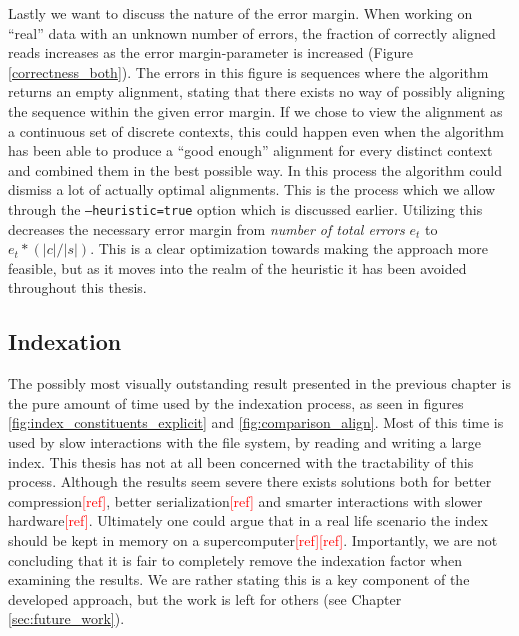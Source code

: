 \documentclass[thesis.tex]{subfiles}
\begin{document}
Lastly we want to discuss the nature of the error margin. When working on ``real'' data with an unknown number of errors, the fraction of correctly aligned reads increases as the error margin-parameter is increased (Figure \ref{correctness_both}). The errors in this figure is sequences where the algorithm returns an empty alignment, stating that there exists no way of possibly aligning the sequence within the given error margin. If we chose to view the alignment as a continuous set of discrete contexts, this could happen even when the algorithm has been able to produce a ``good enough'' alignment for every distinct context and combined them in the best possible way. In this process the algorithm could dismiss a lot of actually optimal alignments. This is the process which we allow through the \texttt{--heuristic=true} option which is discussed earlier. Utilizing this decreases the necessary error margin from \textit{number of total errors} $e_t$ to $e_t*(|c|/|s|)$. This is a clear optimization towards making the approach more feasible, but as it moves into the realm of the heuristic it has been avoided throughout this thesis.
\subsection*{Indexation}
The possibly most visually outstanding result presented in the previous chapter is the pure amount of time used by the indexation process, as seen in figures \ref{fig:index_constituents_explicit} and \ref{fig:comparison_align}. Most of this time is used by slow interactions with the file system, by reading and writing a large index. This thesis has not at all been concerned with the tractability of this process. Although the results seem severe there exists solutions both for better compression\textcolor{red}{[ref]}, better serialization\textcolor{red}{[ref]} and smarter interactions with slower hardware\textcolor{red}{[ref]}. Ultimately one could argue that in a real life scenario the index should be kept in memory on a supercomputer\textcolor{red}{[ref]}\textcolor{red}{[ref]}. Importantly, we are not concluding that it is fair to completely remove the indexation factor when examining the results. We are rather stating this is a key component of the developed approach, but the work is left for others (see Chapter \ref{sec:future_work}).
\end{document}
